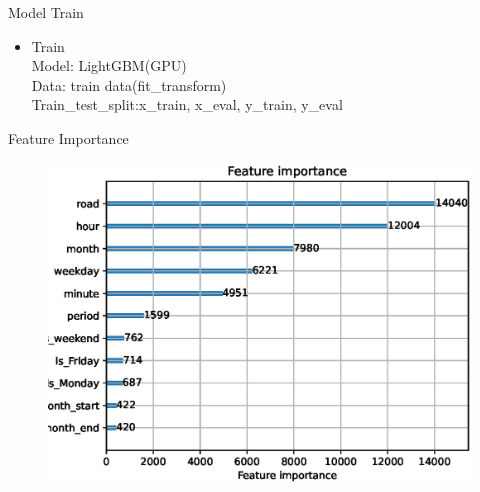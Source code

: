 \documentclass[
 size=14pt,
 paper=smartboard,  %
 mode=present, 		%
 display=slides, 	%
 style=tuliplab,  	%
 pauseslide,
 fleqn,leqno]{powerdot}
\begin{document}
\begin{slide}{Model Train}

\begin{center}
\begin{itemize}

\item
\smallskip
\large
{Train\\
Model: LightGBM(GPU)\\

Data: train data(fit_transform)\\

Train_test_split:x_train, x_eval, y_train, y_eval
}

\end{itemize}
\end{center}
\end{slide}

\begin{slide}{Feature Importance}
	\begin{figure}
		\includegraphics[scale=0.9]{figure/feature_importance.eps}\\	
	\end{figure}
\end{slide}
\end{document}

